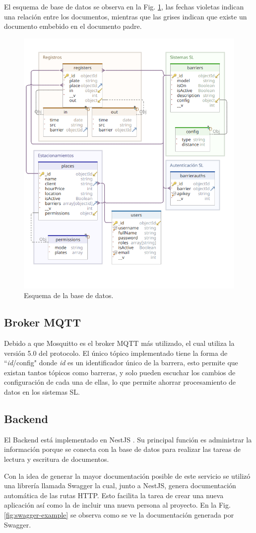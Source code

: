 El esquema de base de datos se observa en la Fig. \ref{fig:db-uml}, las fechas violetas indican una relación entre los documentos, mientras que las grises indican que existe un documento embebido en el documento padre.

\begin{figure}[bth]
    \centering
    \includegraphics[width=.5\textwidth]{imgs/db.png}
    \caption{Esquema de la base de datos.}
    \label{fig:db-uml}
\end{figure}

\subsection{Broker MQTT}

Debido a que Mosquitto es el broker MQTT más utilizado, el cual utiliza la versión 5.0 del protocolo. El único tópico implementado tiene la forma de ``\textit{id}/config" donde \textit{id} es un identificador único de la barrera, esto permite que existan tantos tópicos como barreras, y solo pueden escuchar los cambios de configuración de cada una de ellas, lo que permite ahorrar procesamiento de datos en los sistemas SL.

\subsection{Backend}

El Backend está implementado en NestJS \cite{noauthor_documentacion_nodate}. Su principal función es administrar la información porque se conecta con la base de datos para realizar las tareas de lectura y escritura de documentos.

Con la idea de generar la mayor documentación posible de este servicio se utilizó una librería llamada Swagger la cual, junto a NestJS, genera documentación automática de las rutas HTTP. Esto facilita la tarea de crear una nueva aplicación así como la de incluir una nueva persona al proyecto. En la Fig. \ref{fig:swagger-example} se observa como se ve la documentación generada por Swagger.

